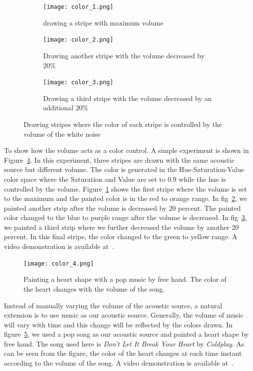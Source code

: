 \begin{figure}[h!]
\centering
  \begin{subfigure}[]{.48\textwidth}
    \texttt{[image: color\_1.png]}
    \caption{drawing a stripe with maximum volume}
    \label{fig:show_color_1_1}
  \end{subfigure}
  \begin{subfigure}[]{.48\textwidth}
    \texttt{[image: color\_2.png]}
    \caption{Drawing another stripe with the volume decreased by $20\%$}
    \label{fig:show_color_1_2}
  \end{subfigure}
  \begin{subfigure}[]{.48\textwidth}
    \texttt{[image: color\_3.png]}
    \caption{Drawing a third stripe with the volume decreased by an additional $20\%$}
    \label{fig:show_color_1_3}
  \end{subfigure}
  \caption{Drawing stripes where the color of each stripe is controlled by the volume of the white noise}
  \label{fig:show_color}
\end{figure}

To show how the volume acts as a color control. A simple experiment is shown in Figure~\ref{fig:show_color}. In this experiment, three stripes are drawn with the same acoustic source but different volume. The color is generated in the Hue-Saturation-Value color space where the Saturation and Value are set to $0.9$ while the hue is controlled by the volume. Figure~\ref{fig:show_color_1_1} shows the first stripe where the volume is set to the maximum and the painted color is in the red to orange range. In fig~\ref{fig:show_color_1_2}, we painted another strip after the volume is decreased by $20$ percent. The painted color changed to the blue to purple range after the volume is decreased. In fig~\ref{fig:show_color_1_3}, we painted a third strip where we further decreased the volume by another $20$ percent. In this final stripe, the color changed to the green to yellow range. A video demonstration is available at~\cite{demo:color}.

\begin{figure}[h!]
  \centering
    \texttt{[image: color\_4.png]}
    \caption{Painting a heart shape with a pop music by free hand. The color of the heart changes with the volume of the song.}
    \label{fig:show_color_2}
\end{figure}

Instead of manually varying the volume of the acoustic source, a natural extension is to use music as our acoustic source. Generally, the volume of music will vary with time and this change will be reflected by the colors drawn. In figure~\ref{fig:show_color_2}, we used a pop song as our acoustic source and painted a heart shape by free hand. The song used here is \emph{Don't Let It Break Your Heart} by \emph{Coldplay}. As can be seen from the figure, the color of the heart changes at each time instant according to the volume of the song. A video demonstration is available at~\cite{demo:color2}.
